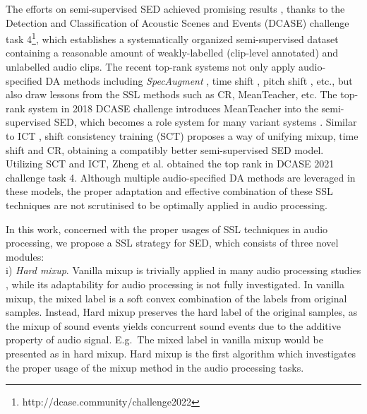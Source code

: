 \documentclass[a4paper]{article}
\begin{document}
The efforts on semi-supervised SED achieved promising results \cite{jiakai2018mean, Zheng2021, Nam2021, Gong2021, koh2021sound}, thanks to the Detection and Classification of Acoustic Scenes and Events (DCASE) challenge task  4\footnote{http://dcase.community/challenge2022}, which establishes a systematically organized semi-supervised dataset \cite{turpault2019sound} containing a reasonable amount of weakly-labelled (clip-level annotated) and unlabelled audio clips. The recent top-rank systems not only apply audio-specified DA methods including \textit{SpecAugment} \cite{park2019specaugment}, time shift \cite{koh2021sound}, pitch shift \cite{mcfee2015software}, etc., but also draw lessons from the SSL methods such as CR, MeanTeacher, etc. The top-rank system in 2018 DCASE challenge \cite{jiakai2018mean} introduces MeanTeacher into the semi-supervised SED, which becomes a role system for many variant systems \cite{Zheng2021, Nam2021, Gong2021, koh2021sound}. Similar to ICT \cite{verma2019interpolation}, shift consistency training (SCT) \cite{koh2021sound} proposes a way of unifying mixup, time shift and CR, obtaining a compatibly better semi-supervised SED model. Utilizing SCT and ICT, Zheng et al. \cite{Zheng2021} obtained the top rank in DCASE 2021 challenge task 4. Although multiple audio-specified DA methods \cite{park2019specaugment, koh2021sound, mcfee2015software} are leveraged in these models, the proper adaptation and effective combination of these SSL techniques are not scrutinised to be optimally applied in audio processing.

In this work, concerned with the proper usages of SSL techniques in audio processing, we propose a SSL strategy for SED, which consists of three novel modules:
\\
\indent i) \emph{Hard mixup}. Vanilla mixup \cite{zhang2017mixup} is trivially applied in many audio processing studies \cite{Kim2021, Tian2021, Lu2021}, while its adaptability for audio processing is not fully investigated. In vanilla mixup, the mixed label is a soft convex combination of the labels from original samples. Instead, Hard mixup preserves the hard label of the original samples, as the mixup of sound events yields concurrent sound events due to the additive property of audio signal. E.g.~The mixed label  in vanilla mixup would be presented as  in hard mixup. Hard mixup is the first algorithm which investigates the proper usage of the mixup method in the audio processing tasks.
\end{document}
